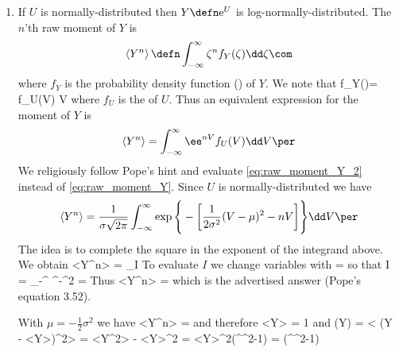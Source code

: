 \documentclass[11pt]{article}
\begin{document}
\begin{enumerate}[label=(\alph*)]

    \item If $U$ is normally-distributed then $Y \defn \text{e}^U$ is log-normally-distributed. The $n$'th 
         raw moment of $Y$ is
         \begin{equation}
            \label{eq:raw_moment_Y}
            \left<Y^n\right> \defn \int_{-\infty}^{\infty} \zeta^n f_{Y}(\zeta) \dd \zeta\com
        \end{equation}
        where $f_Y$ is the probability density function (\pdf) of $Y$. We note that
        \beq
            \label{eq:prob_equiv}
            f_Y(\zeta)\dd \zeta = f_U(V) \dd V\com
        \eeq
        where $f_U$ is the \pdf of $U$. Thus an equivalent expression for the \nth moment of $Y$ is
         \begin{equation}
            \label{eq:raw_moment_Y_2}
            \left<Y^n\right> = \int_{-\infty}^{\infty} \ee^{nV}f_U(V)  \dd V\per
        \end{equation}  
        We religiously follow Pope's hint and evaluate \eqref{eq:raw_moment_Y_2} instead of \eqref{eq:raw_moment_Y}. Since $U$ is normally-distributed we have
        \begin{align}
            \label{eq:raw_moment_Y_3}
            \left<Y^n\right> = \frac{1}{\sigma \sqrt{2\pi}}\int_{-\infty}^{\infty} \exp{\Bigg\{-\left[
        \frac{1}{2\sigma^2}(V-\mu)^2 -n V \right]}\Bigg\}  \dd V\per 
        \end{align} 
        The idea is to complete the square in the exponent of the integrand above. We obtain
        \beq
        \left<Y^n\right> =  _{ I}\per 
        \eeq
        To evaluate $I$ we change variables with
        \beq
            \theta {} {} \Rightarrow \dd \theta
                = \com
        \eeq
        so that
        \beq
        I = \sigma\int_{-\infty}^{\infty} \ee^{-\theta^2} \dd \theta = \sigma \sqrt{2 \pi}\per
        \eeq
        Thus
        \beq
            <Y^n> = \com
        \eeq
        which is the advertised answer (Pope's equation 3.52).

        With $\mu = -\tfrac{1}{2}\sigma^2$ we have
        \beq
        <Y^n> = \com
        \eeq
        and therefore
        \beq
            <Y> = 1\com
        \eeq
        and
        \beq
        (Y) = < (Y - <Y>)^2> = <Y^2> - <Y>^2 = <Y>^2(\ee^{\sigma^2}-1) = (\ee^{\sigma^2}-1) \per 
        \eeq


\end{enumerate}
\end{document}
